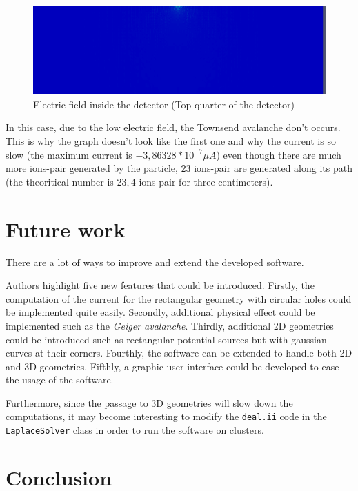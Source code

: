 \documentclass[11pt]{article}
\begin{document}
			\begin{figure}[H]
			  \center
			  \includegraphics[scale=0.4]{images/applications/electric_field.png}
			  \caption{Electric field inside the detector (Top quarter of the detector)}
			  \label{fig:electric_field}
			\end{figure}

			In this case, due to the low electric field, the Townsend avalanche don't occurs. This is why the graph doesn't
			look like the first one and why the current is so slow (the maximum current is $-3,86328*10^{-7}\mu A$) even though 
			there are much more ions-pair generated by the particle, $23$ ions-pair are generated along its path (the theoritical
			number is $23,4$ ions-pair for three centimeters).

\section{Future work}

There are a lot of ways to improve and extend the developed software.

Authors highlight five new features that could be introduced. Firstly, the
computation of the current for the
rectangular geometry with circular holes could be implemented quite easily.
Secondly, additional physical effect
could be implemented such as the \textit{Geiger avalanche}. Thirdly,
additional 2D geometries could be introduced such as
rectangular potential sources but with gaussian curves at their corners.
Fourthly, the software can be extended to handle both 2D and 3D geometries.
Fifthly, a graphic user interface could be developed to ease the usage of the
software.

Furthermore, since the passage to 3D geometries will slow down the computations,
it may become interesting to modify the \texttt{deal.ii} code in the
\texttt{LaplaceSolver} class in order to run the software on clusters. 

\section*{Conclusion}

\newpage



\end{document}
